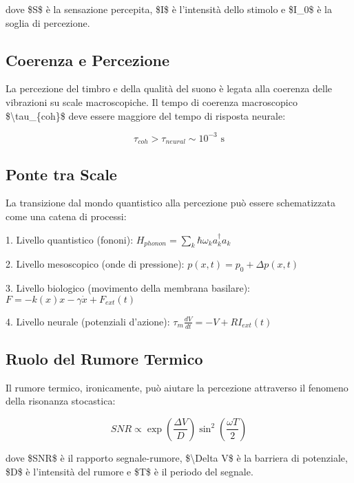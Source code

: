 \documentclass[a4paper,11pt]{article}
\begin{document}
dove \$S\$ è la sensazione percepita, \$I\$ è l'intensità dello stimolo e
\$I\_0\$ è la soglia di percezione.

\subsection{Coerenza e Percezione}\hypertarget{coerenza-e-percezione}{}\label{coerenza-e-percezione}

La percezione del timbro e della qualità del suono è legata alla
coerenza delle vibrazioni su scale macroscopiche. Il tempo di coerenza
macroscopico \$\textbackslash{}tau\_\{coh\}\$ deve essere maggiore del tempo di risposta
neurale:

\begin{displaymath}
\tau_{coh} > \tau_{neural} \sim 10^{-3} \text{ s}
\end{displaymath}

\subsection{Ponte tra Scale}\hypertarget{ponte-tra-scale}{}\label{ponte-tra-scale}

La transizione dal mondo quantistico alla percezione può essere
schematizzata come una catena di processi:

1. Livello quantistico (fononi):
$H_{phonon} = \sum_k \hbar\omega_k a_k^\dagger a_k$

2. Livello mesoscopico (onde di pressione):
$p(x,t) = p_0 + \Delta p(x,t)$

3. Livello biologico (movimento della membrana basilare):
$F = -k(x)x - \gamma\dot{x} + F_{ext}(t)$

4. Livello neurale (potenziali d'azione):
$\tau_m\frac{dV}{dt} = -V + RI_{ext}(t)$

\subsection{Ruolo del Rumore Termico}\hypertarget{ruolo-del-rumore-termico}{}\label{ruolo-del-rumore-termico}

Il rumore termico, ironicamente, può aiutare la percezione attraverso il
fenomeno della risonanza stocastica:

\begin{displaymath}
SNR \propto \exp\left(\frac{\Delta V}{D}\right)\sin^2\left(\frac{\omega T}{2}\right)
\end{displaymath}

dove \$SNR\$ è il rapporto segnale-rumore, \$\textbackslash{}Delta V\$ è la barriera di
potenziale, \$D\$ è l'intensità del rumore e \$T\$ è il periodo del segnale.
\end{document}
